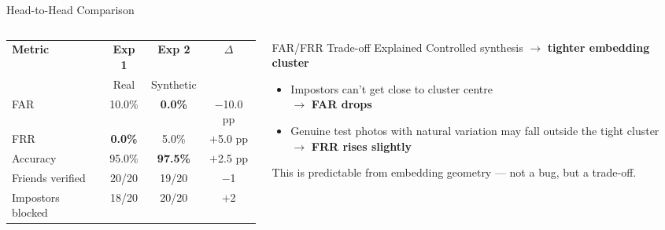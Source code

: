 \documentclass[aspectratio=169]{beamer}
\begin{document}
\begin{frame}{Head-to-Head Comparison}

\begin{columns}[T]
\begin{column}{0.52\textwidth}
    \vspace{4pt}
    \begin{center}
    \begin{tabular}{lccc}
    \toprule
    \textbf{Metric} & \textbf{Exp 1} & \textbf{Exp 2} & \textbf{$\Delta$} \\
    & Real & Synthetic & \\
    \midrule
    FAR      & 10.0\% & \textbf{0.0\%}  & $-$10.0 pp \\
    FRR      & \textbf{0.0\%}  & 5.0\%  & $+$5.0 pp \\
    Accuracy & 95.0\% & \textbf{97.5\%} & $+$2.5 pp \\
    \midrule
    Friends verified  & 20/20 & 19/20 & $-$1 \\
    Impostors blocked & 18/20 & 20/20 & $+$2 \\
    \bottomrule
    \end{tabular}
    \end{center}
\end{column}
\begin{column}{0.44\textwidth}
    \begin{block}{FAR/FRR Trade-off Explained}
        \small
        Controlled synthesis $\rightarrow$ \textbf{tighter embedding cluster}
        \begin{itemize}
            \item Impostors can't get close to cluster centre \\ $\rightarrow$ \textbf{FAR drops}
            \item Genuine test photos with natural variation may fall outside the tight cluster \\ $\rightarrow$ \textbf{FRR rises slightly}
        \end{itemize}
        This is predictable from embedding geometry — not a bug, but a trade-off.
    \end{block}
\end{column}
\end{columns}

\vspace{10pt}
\begin{center}
\end{center}
\end{frame}
\end{document}
